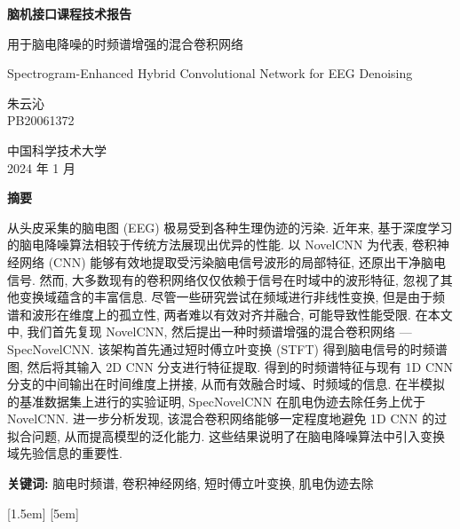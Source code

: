 \documentclass[12pt,a4paper]{article}
\begin{document}
{
\centering
\vspace*{3cm}
{\Huge\heiti\bfseries 脑机接口课程技术报告\par}
\vspace{5cm}
{\Large 用于脑电降噪的时频谱增强的混合卷积网络\\}
{Spectrogram-Enhanced Hybrid Convolutional Network for EEG Denoising\par}
\vfill
{\large 朱云沁\\ PB20061372\par}
\vspace{1cm}
{\Large\fangsong 中国科学技术大学\\ 2024 年 1 月\par}

}
\newpage

{
    {\Large \centering\heiti\bfseries 摘要\par}
    \vspace{1cm}
    {\fangsong 从头皮采集的脑电图 (EEG) 极易受到各种生理伪迹的污染. 近年来, 基于深度学习的脑电降噪算法相较于传统方法展现出优异的性能. 以 NovelCNN 为代表, 卷积神经网络 (CNN) 能够有效地提取受污染脑电信号波形的局部特征, 还原出干净脑电信号. 然而, 大多数现有的卷积网络仅仅依赖于信号在时域中的波形特征, 忽视了其他变换域蕴含的丰富信息. 尽管一些研究尝试在频域进行非线性变换, 但是由于频谱和波形在维度上的孤立性, 两者难以有效对齐并融合, 可能导致性能受限. 在本文中, 我们首先复现 NovelCNN, 然后提出一种时频谱增强的混合卷积网络 — SpecNovelCNN. 该架构首先通过短时傅立叶变换 (STFT) 得到脑电信号的时频谱图, 然后将其输入 2D CNN 分支进行特征提取. 得到的时频谱特征与现有 1D CNN 分支的中间输出在时间维度上拼接, 从而有效融合时域、时频域的信息. 在半模拟的基准数据集上进行的实验证明, SpecNovelCNN 在肌电伪迹去除任务上优于 NovelCNN. 进一步分析发现, 该混合卷积网络能够一定程度地避免 1D CNN 的过拟合问题, 从而提高模型的泛化能力. 这些结果说明了在脑电降噪算法中引入变换域先验信息的重要性. \par}
    \smallskip
    {\heiti\bfseries 关键词:} 脑电时频谱, 卷积神经网络, 短时傅立叶变换, 肌电伪迹去除
}
\newpage

\setcounter{tocdepth}{2}
[1.5em]{\vspace{0.5em}\fangsong}{\contentslabel{1.5em}}{}{\hspace{0.5em}\contentspage}
[5em]{\vspace{0.5em}\fangsong}{\contentslabel{2.5em}}{}{\hspace{0.5em}\contentspage}
\renewcommand{\contentsname}{\centering\heiti\bfseries 目录}
\tableofcontents
\newpage
\end{document}
